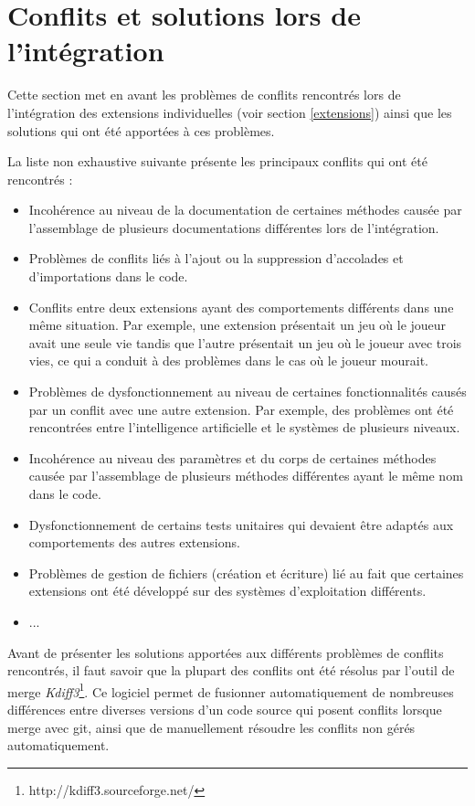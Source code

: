 \documentclass[12pt, openany]{report}
\begin{document}
\section{Conflits et solutions lors de l'intégration}

Cette section met en avant les problèmes de conflits rencontrés lors de l'intégration des extensions individuelles (voir section \ref{extensions}) ainsi que les solutions qui ont été apportées à ces problèmes.

La liste non exhaustive suivante présente les principaux conflits qui ont été rencontrés :\\
\begin{itemize}
\item Incohérence au niveau de la documentation de certaines méthodes causée par l'assemblage de plusieurs documentations différentes lors de l'intégration.

\item Problèmes de conflits liés à l'ajout ou la suppression d'accolades et d'importations dans le code.

\item Conflits entre deux extensions ayant des comportements différents dans une même situation. Par exemple, une extension présentait un jeu où le joueur avait une seule vie tandis que l'autre présentait un jeu où le joueur avec trois vies, ce qui a conduit à des problèmes dans le cas où le joueur mourait.

\item Problèmes de dysfonctionnement au niveau de certaines fonctionnalités causés par un conflit avec une autre extension. Par exemple, des problèmes ont été rencontrées entre l'intelligence artificielle et le systèmes de plusieurs niveaux.

\item Incohérence au niveau des paramètres et du corps de certaines méthodes causée par l'assemblage de plusieurs méthodes différentes ayant le même nom dans le code.

\item Dysfonctionnement de certains tests unitaires qui devaient être adaptés aux comportements des autres extensions.
\item Problèmes de gestion de fichiers (création et écriture) lié au fait que certaines extensions ont été développé sur des systèmes d'exploitation différents.
\item ...
\end{itemize}

Avant de présenter les solutions apportées aux différents problèmes de conflits rencontrés, il faut savoir que la plupart des conflits ont été résolus par l'outil de merge \textit{Kdiff3}\footnote{http://kdiff3.sourceforge.net/}. Ce logiciel permet de fusionner automatiquement de nombreuses différences entre diverses versions d'un code source qui posent conflits lorsque merge avec git, ainsi que de manuellement résoudre les conflits non gérés automatiquement.
\end{document}
